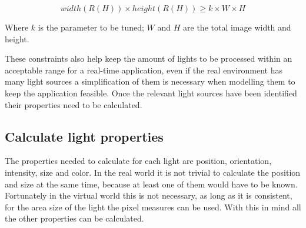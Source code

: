 \begin{equation}
    width(R(H)) \times height(R(H)) \geq k \times W \times H
\end{equation}

Where $k$ is the parameter to be tuned; $W$ and $H$ are the total image width and height.\newline

These constraints also help keep the amount of lights to be processed within an acceptable range for a real-time application, even if the real environment has many light sources a simplification of them is necessary when modelling them to keep the application feasible. Once the relevant light sources have been identified their properties need to be calculated.

\subsection{Calculate light properties}
The properties needed to calculate for each light are position, orientation, intensity, size and color. In the real world it is not trivial to calculate the position and size at the same time, because at least one of them would have to be known. Fortunately in the virtual world this is not necessary, as long as it is consistent, for the area size of the light the pixel measures can be used. With this in mind all the other properties can be calculated.

